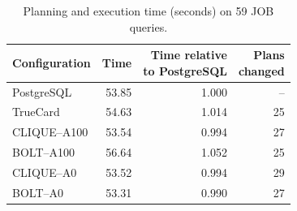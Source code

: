 \begin{table}[!t]
\centering
\small
\setlength{\tabcolsep}{4pt}
\caption{Planning and execution time (seconds) on 59 JOB queries.}
\label{tab:job-e2e}
\begin{tabular}{@{}lrrr@{}}
\toprule
Configuration & Time & \shortstack{Time relative\\to PostgreSQL} & \shortstack{Plans\\changed} \\
\midrule
PostgreSQL   & 53.85 & 1.000 & --  \\
TrueCard     & 54.63 & 1.014 & 25 \\
\midrule
CLIQUE--A100 & 53.54 & 0.994 & 27 \\
BOLT--A100   & 56.64 & 1.052 & 25 \\
\midrule
CLIQUE--A0   & 53.52 & 0.994 & 29 \\
BOLT--A0     & 53.31 & 0.990 & 27 \\
\bottomrule
\end{tabular}
\end{table}
